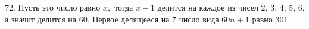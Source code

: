 72. Пусть это число равно $x,$ тогда $x-1$ делится на каждое из чисел 2, 3, 4, 5, 6, а значит делится на 60. Первое делящееся на 7 число вида $60n+1$ равно 301.\\
